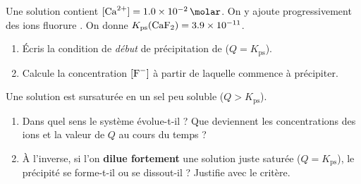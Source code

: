 \documentclass[11pt,a4paper]{article}
\newcommand{\Kps}{K_{\mathrm{ps}}}
\begin{document}
\begin{exercice}
Une solution contient $[\ce{Ca^2+}]=\qty{1{,}0e-2}{\molar}$. On y ajoute progressivement des ions
fluorure . On donne $\Kps(\ce{CaF2})=\num{3{,}9e-11}$.
\begin{enumerate}[label=\alph*),leftmargin=2em,topsep=2pt,itemsep=1pt]
  \item Écris la condition de \emph{début} de précipitation de  ($Q=\Kps$).
  \item Calcule la concentration $[\ce{F-}]$ à partir de laquelle  commence à précipiter.
\end{enumerate}
\end{exercice}

\begin{exercice}
Une solution est sursaturée en un sel peu soluble ($Q>\Kps$).
\begin{enumerate}[label=\alph*),leftmargin=2em,topsep=2pt,itemsep=1pt]
  \item Dans quel sens le système évolue-t-il ? Que deviennent les concentrations des ions et la valeur
        de $Q$ au cours du temps ?
  \item À l'inverse, si l'on \textbf{dilue fortement} une solution juste saturée ($Q=\Kps$), le
        précipité se forme-t-il ou se dissout-il ? Justifie avec le critère.
\end{enumerate}
\end{exercice}
\end{document}
